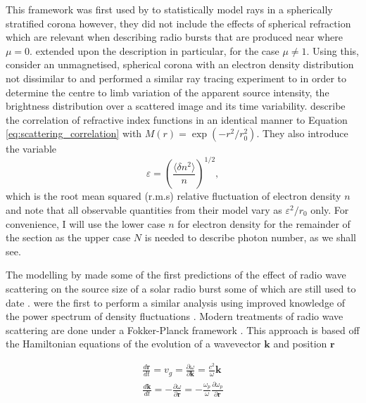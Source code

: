 This framework was first used by \cite{Fokker1965} to statistically model rays in a spherically stratified corona however, they did not include the effects of spherical refraction which are relevant when describing radio bursts that are produced near where $\mu = 0$. \cite{Hollweg1967} extended upon the \cite{Chandrasekhar1952} description in particular, for the case $\mu \neq 1$. Using this, \cite{Steinberg1971} consider an unmagnetised, spherical corona with an electron density distribution not dissimilar to \cite{Newkirk1961} and performed a similar ray tracing experiment to \cite{Fokker1965} in order to determine the centre to limb variation of the apparent source intensity, the brightness distribution over a scattered image and its time variability. \cite{Steinberg1971} describe the correlation of refractive index functions in an identical manner to Equation \ref{eq:scattering_correlation} with $M(r) =  \exp{(-r^2/r_0^2)}$. They also introduce the variable 
$$
\varepsilon =\left( \frac{\langle \delta n^2 \rangle}{n}\right)^{1/2},
$$
which is the root mean squared (r.m.s) relative fluctuation of electron density $n$ and note that all observable quantities from their model vary as $\varepsilon^2/r_0$ only. For convenience, I will use the lower case $n$ for electron density for the remainder of the section as the upper case $N$ is needed to describe photon number, as we shall see.

The modelling by \cite{Steinberg1971} made some of the first predictions of the effect of radio wave scattering on the source size of a solar radio burst some of which are still used to date \citep[e.g.][]{Chrysaphi2018}. \cite{Thejappa2007} were the first to perform a similar analysis using improved knowledge of the power spectrum of density fluctuations \citep{Coles1989}. Modern treatments of radio wave scattering are done under a Fokker-Planck framework \citep{Arzner1999, Bian2019}. This approach is based off the Hamiltonian equations of the evolution of a wavevector $\mathbf{k}$ and position $\mathbf{r}$

\begin{align}
\frac{d \mathbf{r}}{dt} = v_g = \frac{\partial \omega}{\partial \mathbf{k}} = \frac{c^2}{\omega} \mathbf{k} \label{eq:scattering_Hamiltonian_r}\\
\frac{d \mathbf{k}}{dt} = - \frac{\partial \omega}{\partial \mathbf{r}} = - \frac{\omega_p}{\omega}\frac{\partial \omega_p}{\partial \mathbf{r}} \label{eq:scattering_Hamiltonian_k}
\end{align}

